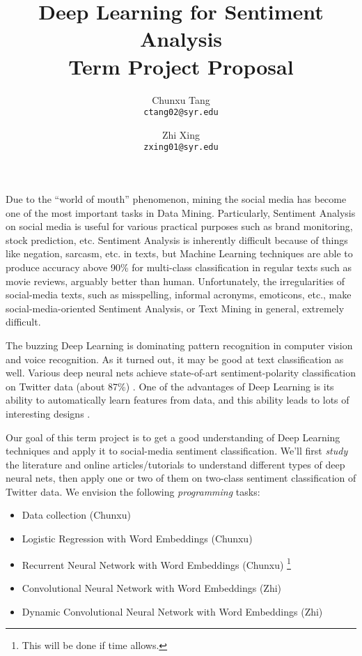 \documentclass[11pt, letterpaper]{article}
\begin{document}
\title{Deep Learning for Sentiment Analysis\\
Term Project Proposal}
\author{Chunxu Tang\\
{\tt ctang02@syr.edu}
\and
Zhi Xing\\
{\tt zxing01@syr.edu}}
\date{}
\maketitle

Due to the ``world of mouth'' phenomenon, mining the social media has become one of the most important tasks in Data Mining. Particularly, Sentiment Analysis on social media is useful for various practical purposes such as brand monitoring, stock prediction, etc. 
Sentiment Analysis is inherently difficult because of things like negation, sarcasm, etc. in texts, but Machine Learning techniques are able to produce accuracy above 90\% for multi-class classification in regular texts such as movie reviews, arguably better than human. Unfortunately, the irregularities of social-media texts, such as misspelling, informal acronyms, emoticons, etc., make social-media-oriented Sentiment Analysis, or Text Mining in general, extremely difficult. 

The buzzing Deep Learning is dominating pattern recognition in computer vision and voice recognition. As it turned out, it may be good at text classification as well. Various deep neural nets achieve state-of-art sentiment-polarity classification on Twitter data (about 87\%) \cite{kalchbrenner2014, kim2014, wang2015}. One of the advantages of Deep Learning is its ability to automatically learn features from data, and this ability leads to lots of interesting designs \cite{dos2014, kalchbrenner2014, kim2014, socher2013, wang2015}.

Our goal of this term project is to get a good understanding of Deep Learning techniques and apply it to social-media sentiment classification. We'll first {\em study} the literature and online articles/tutorials to understand different types of deep neural nets, then apply one or two of them on two-class sentiment classification of Twitter data. We envision the following {\em programming} tasks:
\begin{itemize}
\item Data collection (Chunxu)
\item Logistic Regression with Word Embeddings (Chunxu)
\item Recurrent Neural Network with Word Embeddings (Chunxu) \footnote{\label{ext}This will be done if time allows.}
\item Convolutional Neural Network with Word Embeddings (Zhi)
\item Dynamic Convolutional Neural Network with Word Embeddings (Zhi) 
\end{itemize}

\nocite{*}
{\fontsize{9pt}{10pt}\selectfont


}
\end{document}
